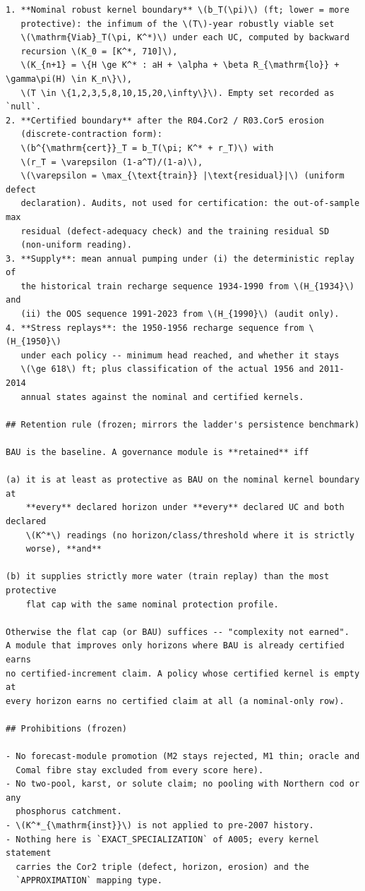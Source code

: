 \documentclass[11pt,a4paper]{article}
\begin{document}
\begin{footnotesize}
\begin{verbatim}
1. **Nominal robust kernel boundary** \(b_T(\pi)\) (ft; lower = more
   protective): the infimum of the \(T\)-year robustly viable set
   \(\mathrm{Viab}_T(\pi, K^*)\) under each UC, computed by backward
   recursion \(K_0 = [K^*, 710]\),
   \(K_{n+1} = \{H \ge K^* : aH + \alpha + \beta R_{\mathrm{lo}} + \gamma\pi(H) \in K_n\}\),
   \(T \in \{1,2,3,5,8,10,15,20,\infty\}\). Empty set recorded as `null`.
2. **Certified boundary** after the R04.Cor2 / R03.Cor5 erosion
   (discrete-contraction form):
   \(b^{\mathrm{cert}}_T = b_T(\pi; K^* + r_T)\) with
   \(r_T = \varepsilon (1-a^T)/(1-a)\),
   \(\varepsilon = \max_{\text{train}} |\text{residual}|\) (uniform defect
   declaration). Audits, not used for certification: the out-of-sample max
   residual (defect-adequacy check) and the training residual SD
   (non-uniform reading).
3. **Supply**: mean annual pumping under (i) the deterministic replay of
   the historical train recharge sequence 1934-1990 from \(H_{1934}\) and
   (ii) the OOS sequence 1991-2023 from \(H_{1990}\) (audit only).
4. **Stress replays**: the 1950-1956 recharge sequence from \(H_{1950}\)
   under each policy -- minimum head reached, and whether it stays
   \(\ge 618\) ft; plus classification of the actual 1956 and 2011-2014
   annual states against the nominal and certified kernels.

## Retention rule (frozen; mirrors the ladder's persistence benchmark)

BAU is the baseline. A governance module is **retained** iff

(a) it is at least as protective as BAU on the nominal kernel boundary at
    **every** declared horizon under **every** declared UC and both declared
    \(K^*\) readings (no horizon/class/threshold where it is strictly
    worse), **and**

(b) it supplies strictly more water (train replay) than the most protective
    flat cap with the same nominal protection profile.

Otherwise the flat cap (or BAU) suffices -- "complexity not earned".
A module that improves only horizons where BAU is already certified earns
no certified-increment claim. A policy whose certified kernel is empty at
every horizon earns no certified claim at all (a nominal-only row).

## Prohibitions (frozen)

- No forecast-module promotion (M2 stays rejected, M1 thin; oracle and
  Comal fibre stay excluded from every score here).
- No two-pool, karst, or solute claim; no pooling with Northern cod or any
  phosphorus catchment.
- \(K^*_{\mathrm{inst}}\) is not applied to pre-2007 history.
- Nothing here is `EXACT_SPECIALIZATION` of A005; every kernel statement
  carries the Cor2 triple (defect, horizon, erosion) and the
  `APPROXIMATION` mapping type.

\end{verbatim}\end{footnotesize}
\end{document}
